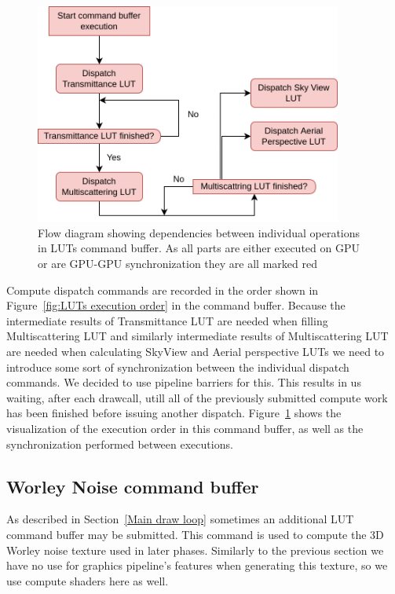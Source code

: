 \documentclass{ctuthesis}
\begin{document}
\begin{figure}
    \centering
    \includegraphics[width=0.9\textwidth]{media/LUTs_command_buffer.png}
    \caption[LUT command buffer dependencies]{Flow diagram showing dependencies between individual operations in LUTs command buffer.
        As all parts are either executed on GPU or are GPU-GPU synchronization they are all marked red}
    \label{fig:LUTs command buffer}
\end{figure}

Compute dispatch commands are recorded in the order shown in Figure~\ref{fig:LUTs execution order}
in the command buffer. Because the intermediate results of Transmittance LUT are needed when filling
Multiscattering LUT and similarly intermediate results of Multiscattering LUT are needed when calculating
SkyView and Aerial perspective LUTs we need to introduce some sort of synchronization between the
individual dispatch commands. We decided to use pipeline barriers for this. This results in us waiting,
after each drawcall, utill all of the previously submitted compute work has been finished before
issuing another dispatch. Figure~\ref{fig:LUTs command buffer} shows the visualization of
the execution order in this command buffer, as well as the synchronization performed between executions.

\subsection{Worley Noise command buffer}
As described in Section~\ref{Main draw loop} sometimes an additional LUT command buffer may be submitted.
This command is used to compute the 3D Worley noise texture used in later phases. Similarly to the 
previous section we have no use for graphics pipeline's features when generating this texture, so we
use compute shaders here as well.
\end{document}
